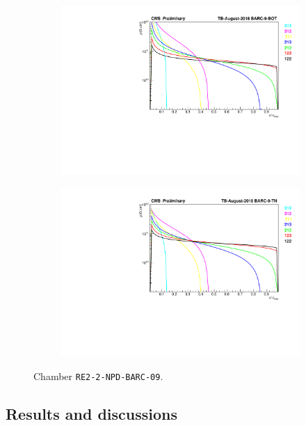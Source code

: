 	\begin{figure}[H]
    	\begin{subfigure}{0.5\linewidth}
			\centering
    		\includegraphics[width = \linewidth]{fig/chapt5/Resistivity-Graph-BARC-9-BOT.pdf}
        	\caption{\label{fig:august-resist:A}}
    	\end{subfigure}
    	\begin{subfigure}{0.5\linewidth}
			\centering
    		\includegraphics[width = \linewidth]{fig/chapt5/Resistivity-Graph-BARC-9-TN.pdf}
        	\caption{\label{fig:august-resist:B}}
    	\end{subfigure}
		\caption{\label{fig:august-resist} Chamber \texttt{RE2-2-NPD-BARC-09}.}
	\end{figure}
	
	\subsection{Results and discussions}
	\label{chapt5:ssec:resultsGIFpp}
    

